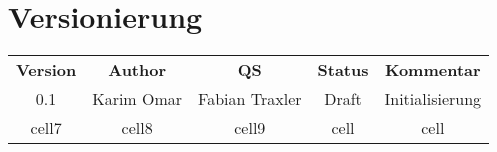 
\section{Versionierung}
\begin{center}
\begin{tabular}{ |c|c|c|c|c| } 
 \hline
 \textbf{Version} & \textbf{Author} & \textbf{QS} & \textbf{Status} & \textbf{Kommentar} \\ 
 0.1 & Karim Omar & Fabian Traxler & Draft & Initialisierung \\ 
 cell7 & cell8 & cell9 & cell & cell \\ 
 \hline
\end{tabular}
\end{center}
